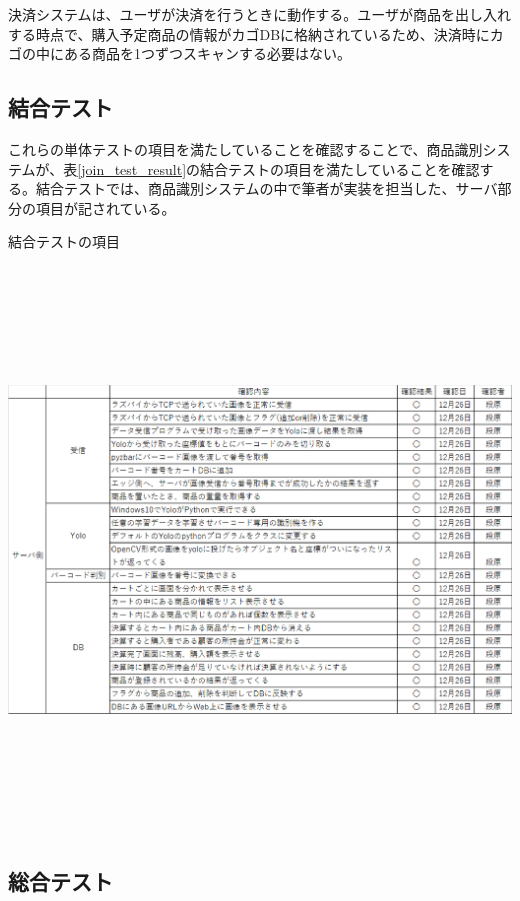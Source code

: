 決済システムは、ユーザが決済を行うときに動作する。ユーザが商品を出し入れする時点で、購入予定商品の情報がカゴDBに格納されているため、決済時にカゴの中にある商品を1つずつスキャンする必要はない。

\newpage


\subsection{結合テスト}

これらの単体テストの項目を満たしていることを確認することで、商品識別システムが、表\ref{join_test_result}の結合テストの項目を満たしていることを確認する。結合テストでは、商品識別システムの中で筆者が実装を担当した、サーバ部分の項目が記されている。

\begin{table}[htbp]
\centering
\caption{結合テストの項目}
\includegraphics[height=15cm,width=15cm]{./pic/result/join_test_result.eps}
\label{join_test_result}
\end{table}

\newpage

\subsection{総合テスト}

